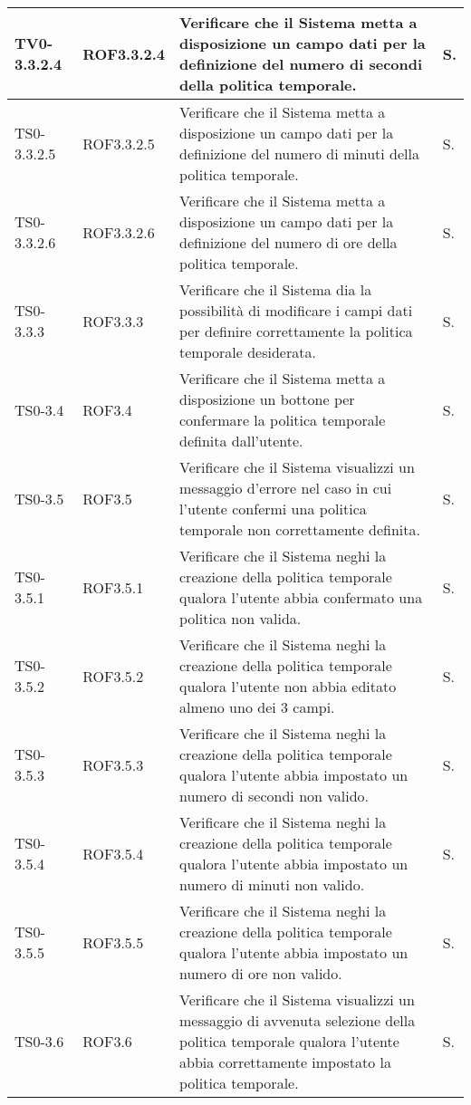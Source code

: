 \begin{longtable}{|C{.15\textwidth}|C{.14\textwidth}|m{.52\textwidth}|m{.08\textwidth}|}
\hline
{}TV0-3.3.2.4 & ROF3.3.2.4 & Verificare che il Sistema metta a disposizione un campo dati per la definizione del numero di secondi della politica temporale. & S. \\
\hline
TS0-3.3.2.5 & ROF3.3.2.5 & Verificare che il Sistema metta a disposizione un campo dati per la definizione del numero di minuti della politica temporale. & S. \\
\hline
{}TS0-3.3.2.6 & ROF3.3.2.6 & Verificare che il Sistema metta a disposizione un campo dati per la definizione del numero di ore della politica temporale. & S. \\
\hline
TS0-3.3.3 & ROF3.3.3 & Verificare che il Sistema dia la possibilità di modificare i campi dati per definire correttamente la politica temporale desiderata. & S. \\
\hline
{}TS0-3.4 & ROF3.4 & Verificare che il Sistema metta a disposizione un bottone per confermare la politica temporale definita dall'utente. & S. \\
\hline
TS0-3.5 & ROF3.5 & Verificare che il Sistema visualizzi un messaggio d'errore nel caso in cui l'utente confermi una politica temporale non correttamente definita. & S. \\
\hline
{}TS0-3.5.1 & ROF3.5.1 & Verificare che il Sistema neghi la creazione della politica temporale qualora l'utente abbia confermato una politica non valida. & S. \\
\hline
TS0-3.5.2 & ROF3.5.2 & Verificare che il Sistema neghi la creazione della politica temporale qualora l'utente non abbia editato almeno uno dei 3 campi. & S. \\
\hline
{}TS0-3.5.3 & ROF3.5.3 & Verificare che il Sistema neghi la creazione della politica temporale qualora l'utente abbia impostato un numero di secondi non valido. & S. \\
\hline
TS0-3.5.4 & ROF3.5.4 & Verificare che il Sistema neghi la creazione della politica temporale qualora l'utente abbia impostato un numero di minuti non valido. & S. \\
\hline
{}TS0-3.5.5 & ROF3.5.5 & Verificare che il Sistema neghi la creazione della politica temporale qualora l'utente abbia impostato un numero di ore non valido. & S. \\
\hline
TS0-3.6 & ROF3.6 & Verificare che il Sistema visualizzi un messaggio di avvenuta selezione della politica temporale qualora l'utente abbia correttamente impostato la politica temporale. & S. \\

\end{longtable}

